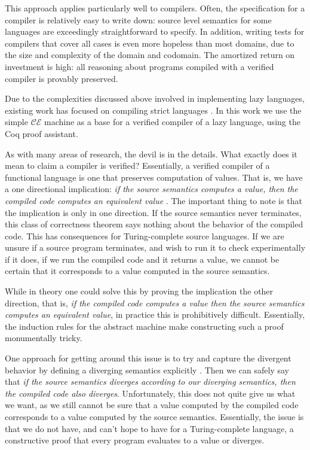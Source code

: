 This approach applies particularly well to compilers. Often, the specification
for a compiler is relatively easy to write down: source level semantics for some
languages are exceedingly straightforward to specify. In addition, writing tests 
for compilers that cover all cases is even more hopeless than most domains, due
to the size and complexity of the domain and codomain. The amortized return on
investment is high: all reasoning about programs compiled with a verified
compiler is provably preserved. 

Due to the complexities discussed above involved in implementing lazy languages,
existing work has focused on compiling strict languages
\cite{chlipala2007certified, leroy2012compcert, cakeml14}. In this work we use
the simple $\mathcal{CE}$ machine as a base for a verified compiler of a lazy
language, using the Coq proof assistant. 

As with many areas of research, the devil is in the details. What exactly does
it mean to claim a compiler is verified?  Essentially, a verified compiler of a
functional language is one that preserves computation of values. That is, we
have a one directional implication: \emph{if the source semantics computes a
value, then the compiled code computes an equivalent value}
\cite{chlipala2007certified}. The important thing to note is that the
implication is only in one direction. If the source semantics never terminates,
this class of correctness theorem says nothing about the behavior of the
compiled code. This has consequences for Turing-complete source languages. If we
are unsure if a source program terminates, and wish to run it to check
experimentally if it does, if we run the compiled code and it returns a value,
we cannot be certain that it corresponds to a value computed in the source
semantics. 

While in theory one could solve this by proving the implication the other
direction, that is, \emph{if the compiled code computes a value then the source
semantics computes an equivalent value}, in practice this is prohibitively
difficult. Essentially, the induction rules for the abstract machine make
constructing such a proof monumentally tricky. 

One approach for getting around this issue is to try and capture the divergent
behavior by defining a diverging semantics explicitly \cite{functionalbigstep}.
Then we can safely say that \emph{if the source semantics diverges according to
our diverging semantics, then the compiled code also diverges}. Unfortunately,
this does not quite give us what we want, as we still cannot be sure that a value
computed by the compiled code corresponds to a value computed by the source
semantics. Essentially, the issue is that we do not have, and can't hope to have
for a Turing-complete language, a constructive proof that every program
evaluates to a value or diverges.  

